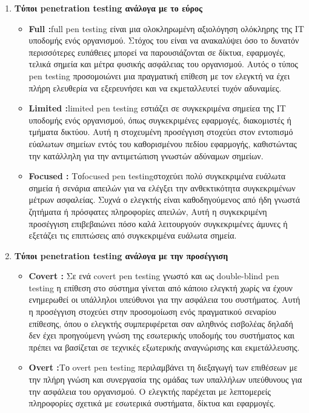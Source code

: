 {\begin{enumerate}
\begin{itemize}
    \end{itemize}
    \item{\textbf{ Τύποι \lt penetration testing \gt ανάλογα με το εύρος}}
    \begin{itemize}
        \item \textbf{\lt Full :} \lt full pen testing \gt είναι μια ολοκληρωμένη αξιολόγηση ολόκληρης της IT υποδομής ενός οργανισμού. Στόχος του είναι να ανακαλύψει όσο το δυνατόν περισσότερες ευπάθειες μπορεί να παρουσιάζονται σε δίκτυα, εφαρμογές, τελικά σημεία και μέτρα φυσικής ασφάλειας του οργανισμού. Αυτός ο τύπος \lt pen testing \gt προσομοιώνει μια πραγματική επίθεση με τον ελεγκτή να έχει πλήρη ελευθερία να εξερευνήσει και να εκμεταλλευτεί τυχόν αδυναμίες. 
        \item \textbf{\lt Limited :} \lt limited pen testing \gt εστιάζει σε συγκεκριμένα σημείεα  της IT υποδομής ενός οργανισμού, όπως συγκεκριμένες εφαρμογές, διακομιστές ή τμήματα δικτύου. Αυτή η στοχευμένη προσέγγιση στοχεύει στον εντοπισμό εύαλωτων σημείων εντός του καθορισμένου πεδίου εφαρμογής, καθιστώντας την κατάλληλη για την αντιμετώπιση γνωστών αδύναμων σημείων.

        \item \textbf{\lt Focused :} \gt Το\lt focused pen testing στοχεύει πολύ συγκεκριμένα ευάλωτα σημεία ή σενάρια απειλών για να ελέγξει την ανθεκτικότητα συγκεκριμένων μέτρων ασφαλείας. Συχνά ο ελεγκτής είναι καθοδηγούμενος από ήδη γνωστά ζητήματα ή πρόσφατες πληροφορίες απειλών, Αυτή η συγκεκριμένη προσέγγιση επιβεβαιώνει πόσο καλά λειτουργούν συγκεκριμένες άμυνες ή εξετάζει τις επιπτώσεις από συγκεκριμένα ευάλωτα σημεία. 
    \end{itemize}
    \item{\textbf{ Τύποι \lt penetration testing \gt ανάλογα με την προσέγγιση}}\
    \begin{itemize}
        \item \textbf{\lt Covert :} \gt Σε ενά  \lt covert pen testing \gt γνωστό και ως \lt double-blind pen testing \gt η επίθεση στο σύστημα γίνεται από κάποιο ελεγκτή χωρίς να έχουν ενημερωθεί οι υπάλληλοι υπεύθυνοι για την ασφάλεια  του συστήματος. Αυτή η προσέγγιση στοχεύει στην προσομοίωση ενός πραγματικού σεναρίου επίθεσης, όπου ο ελεγκτής συμπεριφέρεται σαν αληθινός εισβολέας  δηλαδή δεν έχει προηγούμενη γνώση της εσωτερικής υποδομής του συστήματος και πρέπει να βασίζεται σε τεχνικές εξωτερικής αναγνώρισης και εκμετάλλευσης.
        \item \textbf{\lt Overt :}Το \lt overt pen testing \gt περιλαμβάνει τη διεξαγωγή των επιθέσεων με την πλήρη γνώση και συνεργασία της ομάδας των υπαλλήλων υπεύθυνους για την ασφάλεια του οργανισμού. Ο ελεγκτής παρέχεται με λεπτομερείς πληροφορίες σχετικά με εσωτερικά συστήματα, δίκτυα και εφαρμογές. 
        

\end{itemize}
\end{enumerate}}
